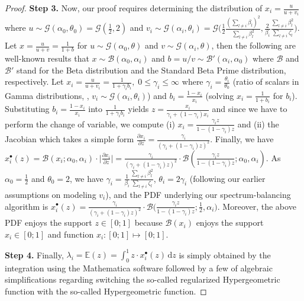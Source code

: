 \begin{proof}[Proof]
\vspace{0.1cm}\noindent
\textbf{Step 3.} 
Now, our proof requires determining the distribution of $x_i=\frac{u}{u+v_i}$ where $u\sim\mathcal{G}(\alpha_0,\theta_0)=\mathcal{G}(\frac{1}{2},2)$ and $v_i\sim\mathcal{G}(\alpha_i,\theta_i)=\mathcal{G}\Big(\frac{1}{2}\frac{(\sum_{l\neq i}\beta_l)^2}{\sum_{l\neq i}\beta_l^2}, \frac{2}{\beta_i}\frac{\sum_{l\neq i}\beta_l^2}{\sum_{l\neq i} \zeta_l} \Big)$. Let $x=\frac{u}{u+v}=\frac{1}{1+b}$ for $u\sim\mathcal{G}(\alpha_0,\theta)$ and $v\sim\mathcal{G}(\alpha_i,\theta)$, then  the following are well-known results that  $x\sim\mathcal{B}(\alpha_0,\alpha_i)$  and $b=u/v\sim\mathcal{B}'(\alpha_i,\alpha_0)$ where $\mathcal{B}$ and $\mathcal{B}'$ stand for the Beta distribution and the Standard Beta Prime distribution, respectively. Let $x_i=\frac{u}{u+v_i}=\frac{1}{1+\gamma_i b_i},\;0\leq\gamma_i\leq\infty$ where $\gamma_i=\frac{\theta_i}{\theta_0}$ (ratio of scalars in Gamma distributions, \ie, $v_i\sim\mathcal{G}(\alpha_i,\theta_i)$)  and $b_i=\frac{1-x_i}{x_i}$ (solving $x_i=\frac{1}{1+b_i}$ for $b_i$). Substituting $b_i=\frac{1-x_i}{x_i}$ into $\frac{1}{1+\gamma_i b_i}$ yields $z=\frac{x_i}{\gamma_i+(1-\gamma_i)x_i}$ and since we have to perform the change of variable, we compute (i) $x_i=\frac{\gamma_i z}{1-(1-\gamma_i)z}$ and (ii) the Jacobian which takes a simple form $\frac{\partial x_i}{\partial z}=\frac{\gamma_i}{(\gamma_i+(1-\gamma_i)z)^2}$. Finally, we have $x^\bullet_i(z)= \mathcal{B}(x_i; \alpha_0,\alpha_i)\cdot\lvert\frac{\partial x_i}{\partial z}\rvert=\frac{\gamma_i}{(\gamma_i+(1-\gamma_i)z)^2}\cdot\mathcal{B}\left(\frac{\gamma_i z}{1-(1-\gamma_i)z}; \alpha_0,\alpha_i\right)$. As $\alpha_0=\frac{1}{2}$ and $\theta_0=2$, we have $\gamma_i=\frac{1}{\beta_i}\frac{\sum_{l\neq i}\beta_l^2}{\sum_{l\neq i} \zeta_l} $, $\theta_i=2\gamma_i$ (following our earlier assumptions on modeling $v_i$), and the PDF underlying our spectrum-balancing algorithm is $x^\bullet_i(z)=\frac{\gamma_i}{(\gamma_i+(1-\gamma_i)z)^2}\cdot\mathcal{B}\Big(\frac{\gamma_i z}{1-(1-\gamma_i)z}; \frac{1}{2},\alpha_i\Big)$. Moreover, the above PDF enjoys the support $z\in[0 ;1]$ because $\mathcal{B}(x_i)$ enjoys the support $x_i\in[0 ;1]$ and function $x_i: [0 ;1]\longmapsto[0 ;1]$.

\vspace{0.1cm}\noindent
\textbf{Step 4.} 
Finally, $\lambda_i=\mathbb{E}(z)=\int_0^1 z\cdot x^\bullet_i(z) \, \mathrm{d}z$ is simply obtained by the integration using the Mathematica software followed by a few of algebraic simplifications regarding switching the so-called regularized Hypergeometric function with the so-called Hypergeometric function.
\end{proof}

